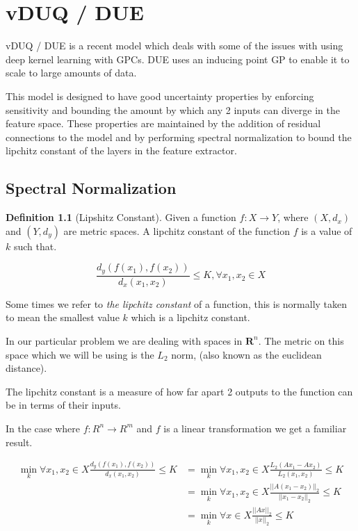 \documentclass[12pt, a4paper]{report}
\theoremstyle{definition}
\theoremstyle{definition}
\newtheorem{definition}{Definition}[section]
\theoremstyle{definition}
\begin{document}
\chapter{vDUQ / DUE}
\label{sec:DUE}

vDUQ / DUE \cite{vanamersfoort2020uncertainty} is a recent model which deals with some of the issues with using deep kernel learning with GPCs. DUE uses an inducing point GP to enable it to scale to large amounts of data.

This model is designed to have good uncertainty properties by enforcing sensitivity and bounding the amount by which any 2 inputs can diverge in the feature space. These properties are maintained by the addition of residual connections to the model and by performing spectral normalization to bound the lipchitz constant of the layers in the feature extractor.

\section{Spectral Normalization}

\begin{definition}[Lipshitz Constant]
    Given a function $f: X \rightarrow Y$, where $(X, d_x)$ and $(Y, d_y)$ are metric spaces. A lipchitz constant of the function $f$ is a value of $k$ such that.

    $$\frac{d_y(f(x_1), f(x_2))}{d_x(x_1, x_2)} \leq K, \forall x_1, x_2 \in X $$
\end{definition}

Some times we refer to \textit{the lipchitz constant} of a function, this is normally taken to mean the smallest value $k$ which is a lipchitz constant.

In our particular problem we are dealing with spaces in $\mathbf{R}^n$. The metric on this space which we will be using is the $L_2$ norm, (also known as the euclidean distance).

The lipchitz constant is a measure of how far apart 2 outputs to the function can be in terms of their inputs.

In the case where $f: R^n \rightarrow R^m$ and $f$ is a linear transformation we get a familiar result.

\begin{align*}
    \min_k  \forall x_1,x_2 \in X \frac{d_y(f(x_1), f(x_2))}{d_x(x_1, x_2)} \leq K &= \min_k \forall x_1,x_2 \in X \frac{ L_2(Ax_1 - Ax_2)  }{ L_2(x_1, x_2)} \leq K \\
    &=  \min_k \forall x_1,x_2 \in X  \frac{ ||A(x_1 - x_2)||_2  }{ ||x_1- x_2||_2 } \leq K \\
    &=  \min_k \forall x \in X  \frac{ ||Ax||_2  }{ ||x||_2 } \leq K \\
\end{align*}
\end{document}

